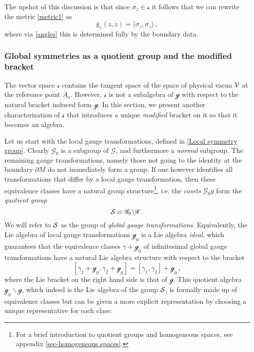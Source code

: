 \documentclass[11pt,a4paper]{article}
\def\calg{{\mathscr G}}
\def\calsg{{\boldsymbol{\mathscr g}}}
\def\cals{{\cal S}}
\def\calss{{\boldsymbol{\mathscr s}}}
\def\calv{{\cal V}}
\def\rg{{\mathrm{g}}}
\begin{document}
The upshot of this discussion is that since $\sigma_z\in\calss$ it follows that we can rewrite the metric \eqref{metric1} as
    \begin{equation}
    \bar\rg_z(\dot z,\dot z)=\langle\sigma_z,\sigma_z\rangle\label{YMmetric}\,,
    \end{equation}
    where via \eqref{angles} this is determined fully by the boundary data.
    
    \subsubsection{Global symmetries as a quotient group and the modified bracket}\label{secglob}
    
    The vector space $\calss$ contains the tangent space of the space of physical vacua $\calv$ at the reference point $\bar A_o$. However, $\calss$ is not a subalgebra of $\calsg$ with respect to the natural bracket induced form $\calsg$. In this section, we present another characterization of $\calss$ that introduces a unique \textit{modified} bracket on it so that it becomes an algebra. 
    
    Let us start with the local gauge transformations, defined in \eqref{Local symmetry group}. Clearly $\calg_0$ is a subgroup of $\calg$, and furthermore a \textit{normal} subgroup.  The remaining gauge transformations, namely those not going to the identity at the boundary $\partial M$ do not immediately form a group. If one however identifies all transformations that differ by a local gauge transformation, then these equivalence classes have a natural group structure\footnote{For a brief introduction to quotient groups and homogeneous spaces, see appendix \ref{sec-homogeneous spaces}.}, i.e. the \textit{cosets} $\calg_0g$ form the \textit{quotient group} 
    \begin{equation}\label{quotient_group}
    \cals\equiv\calg_0\backslash\calg\,.
    \end{equation}
    We will refer to $\cals$ as the group of \textit{global gauge transformations}. 
    Equivalently, the Lie algebra of local gauge transformations $\calsg_0$ is a Lie algebra \textit{ideal}, which guarantees that the equivalence classes $\gamma+\calsg_0$ of infinitesimal global gauge transformations have a natural Lie algebra structure with respect to the bracket
    \begin{equation}\label{coset algebra}
    [\gamma_1+\calsg_0,\gamma_2+\calsg_0]=[\gamma_1,\gamma_2]+\calsg_0\,,
    \end{equation}
    where the Lie bracket on the right hand side is that of $\calsg$. This quotient algebra $\calsg_0\backslash \calsg$, which indeed is the Lie algebra of the group $\cals$, is formally made up of equivalence classes but can be given a more explicit representation by choosing a unique representative for each class: 
    
\end{document}

